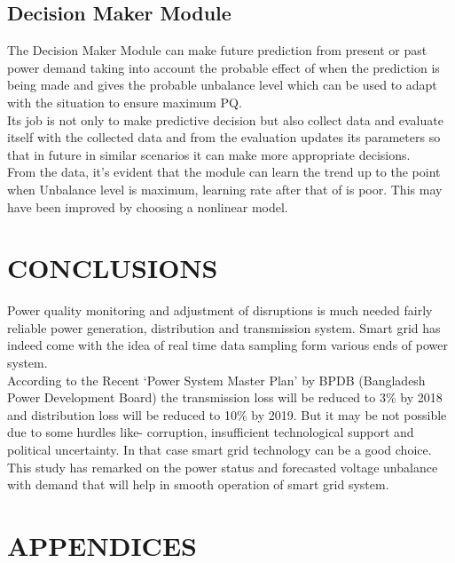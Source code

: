 \documentclass[a4paper,12pt,oneside]{book}
\begin{document}
\section*{Decision Maker Module}
The Decision Maker Module can make future prediction from present or past power demand taking into account the probable effect of when the prediction is being made and gives the probable unbalance level which can be used to adapt with the situation to ensure maximum PQ.\\
Its job is not only to make predictive decision but also collect data and evaluate itself with the collected data and from the evaluation updates its parameters so that in future in similar scenarios it can make more appropriate decisions.\\
From the data, it's evident that the module can learn the trend up to the point when Unbalance level is maximum, learning rate after that of is poor. This may have been improved by choosing a nonlinear model.


\chapter{CONCLUSIONS}\label{chap:concl}
\label{sec:conclusion}
Power quality monitoring and adjustment of disruptions is much needed fairly reliable power generation, distribution and transmission system. Smart grid has indeed come with the idea of real time data sampling form various ends of power system.\\
According to the Recent ‘Power System Master Plan’ by BPDB (Bangladesh Power Development Board) the transmission loss will be reduced to 3\% by 2018 and distribution loss will be reduced to 10\% by 2019. But it may be not possible due to some hurdles like- corruption, insufficient technological support and political uncertainty. In that case smart grid technology can be a good choice.\\
This study has remarked on the power status and forecasted voltage unbalance with demand that will help in smooth operation of smart grid system.

\backmatter
\renewcommand\bibname{REFERENCES}
 \label{refs}
\printbibliography[title={REFERENCES}]


\appendix
\chapter{\MakeUppercase{Appendices}}
\label{app:myappendix}
\end{document}
